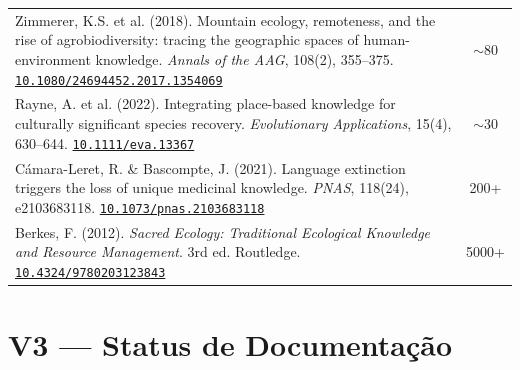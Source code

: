 \documentclass[a4paper,11pt]{article}
\newcommand{\doi}[1]{\href{https://doi.org/#1}{\texttt{#1}}}
\begin{document}
\begin{longtable}{>{\raggedright\arraybackslash}p{} c}
Zimmerer, K.S. et al. (2018). Mountain ecology, remoteness, and the rise of agrobiodiversity: tracing the geographic spaces of human-environment knowledge. \textit{Annals of the AAG}, 108(2), 355--375.\newline
\doi{10.1080/24694452.2017.1354069} & $\sim$80 \\
\addlinespace

Rayne, A. et al. (2022). Integrating place-based knowledge for culturally significant species recovery. \textit{Evolutionary Applications}, 15(4), 630--644.\newline
\doi{10.1111/eva.13367} & $\sim$30 \\
\addlinespace

Cámara-Leret, R. \& Bascompte, J. (2021). Language extinction triggers the loss of unique medicinal knowledge. \textit{PNAS}, 118(24), e2103683118.\newline
\doi{10.1073/pnas.2103683118} & 200+ \\
\addlinespace

Berkes, F. (2012). \textit{Sacred Ecology: Traditional Ecological Knowledge and Resource Management}. 3rd ed. Routledge.\newline
\doi{10.4324/9780203123843} & 5000+ \\

\bottomrule
\end{longtable}

\section{V3 --- Status de Documentação}
\end{document}
